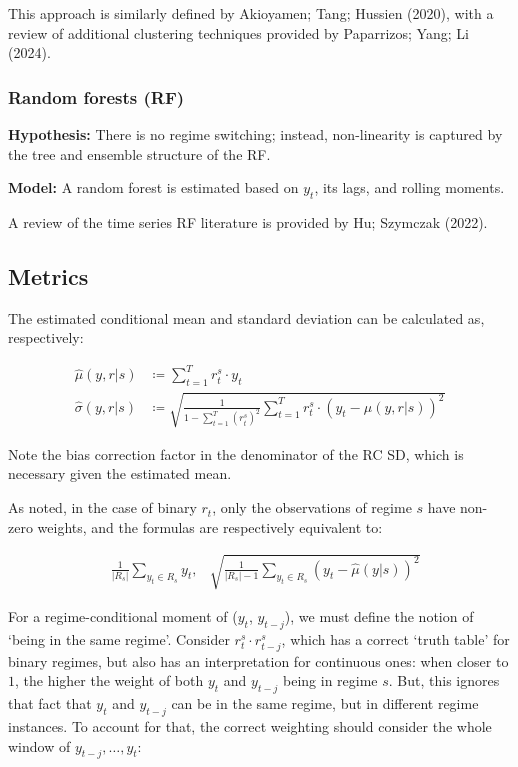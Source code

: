 \documentclass[
  letterpaper,
  DIV=11,
  numbers=noendperiod]{scrartcl}
\numberwithin{equation}{section}
\numberwithin{table}{section}
\numberwithin{figure}{section}
\begin{document}
This approach is similarly defined by Akioyamen; Tang; Hussien (2020),
with a review of additional clustering techniques provided by
Paparrizos; Yang; Li (2024).

\subsubsection{Random forests (RF)}\label{random-forests-rf}

\textbf{Hypothesis:} There is no regime switching; instead,
non-linearity is captured by the tree and ensemble structure of the RF.

\textbf{Model:} A random forest is estimated based on \(y_t\), its lags,
and rolling moments.

A review of the time series RF literature is provided by Hu; Szymczak
(2022).

\subsection{Metrics}\label{sec-app-metrics}

The estimated conditional mean and standard deviation can be calculated
as, respectively:

\begin{align}
    \hat{\mu}(y, r | s) & \coloneqq \sum_{t = 1}^T r^s_t \cdot y_t\\
    \hat{\sigma}(y, r | s) & \coloneqq \sqrt{\frac{1}{1 - \sum_{t = 1}^T{(r^s_t)^2}}\sum_{t = 1}^T r^s_t \cdot (y_t - \hat{\mu}(y, r | s))^2}
\end{align}

Note the bias correction factor in the denominator of the RC SD, which
is necessary given the estimated mean.

As noted, in the case of binary \(r_t\), only the observations of regime
\(s\) have non-zero weights, and the formulas are respectively
equivalent to:

\begin{align*}
    &\frac{1}{|R_s|} \sum_{y_t \in R_s} y_t, &\sqrt{\frac{1}{|R_s| - 1} \sum_{y_t \in R_s} (y_t - \hat{\mu}(y | s))^2}
\end{align*}

For a regime-conditional moment of (\(y_{t}\), \(y_{t-j}\)), we must
define the notion of `being in the same regime'. Consider
\(r^s_t \cdot r^s_{t-j}\), which has a correct `truth table' for binary
regimes, but also has an interpretation for continuous ones: when closer
to \(1\), the higher the weight of both \(y_t\) and \(y_{t-j}\) being in
regime \(s\). But, this ignores that fact that \(y_t\) and \(y_{t-j}\)
can be in the same regime, but in different regime instances. To account
for that, the correct weighting should consider the whole window of
\(y_{t-j}, \dots, y_t\):
\end{document}
